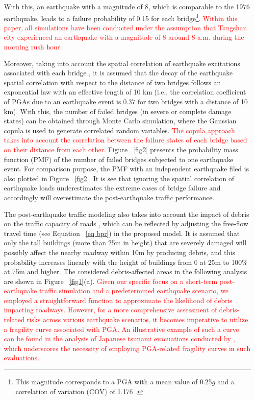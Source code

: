 \documentclass[review,11pt,nonatbib]{elsarticle}
\begin{document}
With this, an earthquake with a magnitude of 8, which is comparable to the 1976 earthquake, leads to a failure probability of 0.15 for each bridge\footnote{This magnitude corresponds to a PGA with a mean value of 0.25$g$ \citep{gb50011code} and a correlation of variation (COV) of 1.176 \citep{gao1985probabilistic}.}. \textcolor{red}{Within this paper, all simulations have been conducted under the assumption that Tangshan city experienced an earthquake with a magnitude of 8 around 8 a.m. during the morning rush hour.}

Moreover, taking into account the spatial correlation of earthquake excitations associated with each bridge \citep{wang2005macrospatial,jayaram2009correlation}, it is assumed that the decay of the earthquake spatial correlation with respect to the distance of two bridges follows an exponential law with an effective length of 10 km (i.e., the correlation coefficient of PGAs due to an earthquake event is 0.37 for two bridges with a distance of 10 km). With this, the number of failed bridges (in severe or complete damage states) can be obtained through Monte Carlo simulation, where the Gaussian copula \citep{nelsen1999introduction} is used to generate correlated random variables. \textcolor{red}{The copula approach takes into account the correlation between the failure states of each bridge based on their distance from each other.} Figure ~\ref{fig2} presents the probability mass function (PMF) of the number of failed bridges subjected to one earthquake event. For comparison purpose, the PMF with an independent earthquake filed is also plotted in Figure ~\ref{fig2}. It is see that ignoring the spatial correlation of earthquake loads underestimates the extreme cases of bridge failure and accordingly will overestimate the post-earthquake traffic performance.
\par The post-earthquake traffic modeling also takes into account the impact of debris on the traffic capacity of roads \citep{roess2011traffic}, which can be reflected by adjusting the free-flow travel time (see Equation ~\eqref{eq bpr}) in the proposed model. It is assumed that only the tall buildings (more than 25m in height) that are severely damaged will possibly affect the nearby roadway within 10m by producing debris, and this probability increases linearly with the height of buildings from 0 at 25m to 100\% at 75m and higher. The considered debris-affected areas in the following analysis are shown in Figure ~\ref{fig1}(a). \textcolor{red}{ Given our specific focus on a short-term post-earthquake traffic simulation and a predetermined earthquake scenario, we employed a straightforward function to approximate the likelihood of debris impacting roadways. However, for a more comprehensive assessment of debris-related risks across various earthquake scenarios, it becomes imperative to utilize a fragility curve associated with PGA. An illustrative example of such a curve can be found in the analysis of Japanese tsunami evacuations conducted by \citet{castro2019modeling}, which underscores the necessity of employing PGA-related fragility curves in such evaluations. }
\end{document}

